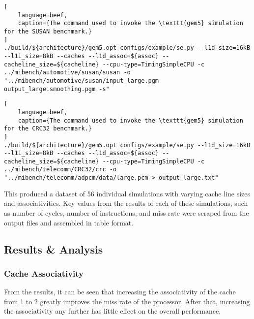\begin{lstlisting}[
    language=beef,
    caption={The command used to invoke the \texttt{gem5} simulation for the SUSAN benchmark.}
]
./build/${architecture}/gem5.opt configs/example/se.py --l1d_size=16kB --l1i_size=8kB --caches --l1d_assoc=${assoc} --cacheline_size=${cacheline} --cpu-type=TimingSimpleCPU -c ../mibench/automotive/susan/susan -o "../mibench/automotive/susan/input_large.pgm output_large.smoothing.pgm -s"
\end{lstlisting}

\begin{lstlisting}[
    language=beef,
    caption={The command used to invoke the \texttt{gem5} simulation for the CRC32 benchmark.}
]
./build/${architecture}/gem5.opt configs/example/se.py --l1d_size=16kB --l1i_size=8kB --caches --l1d_assoc=${assoc} --cacheline_size=${cacheline} --cpu-type=TimingSimpleCPU -c ../mibench/telecomm/CRC32/crc -o "../mibench/telecomm/adpcm/data/large.pcm > output_large.txt"
\end{lstlisting}

This produced a dataset of 56 individual simulations with varying cache line sizes and
associativities.
Key values from the results of each of these simulations, such as number of cycles,
number of instructions, and miss rate were scraped from the output files and assembled 
in table format.

\subsection{Results \& Analysis}

\subsubsection{Cache Associativity}

From the results, it can be seen that increasing the associativity of the cache from 
1 to 2 greatly improves the miss rate of the processor. After that, increasing the 
associativity any further has little effect on the overall performance.


